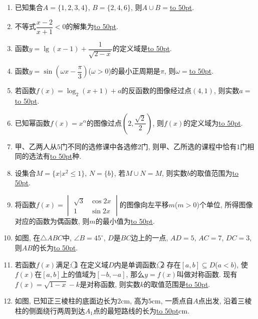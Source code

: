 \documentclass[10pt,a4paper]{article}
\newcommand{\blank}[1]{\underline{\hbox to #1pt{}}}
\begin{document}
\begin{enumerate}[1.]

\item 已知集合$A=\{1,2,3,4\}$, $B=\{2,4,6\}$, 则$A\cup B=$\blank{50}.
\item 不等式$\dfrac{x-2}{x+1}<0$的解集为\blank{50}.
\item 函数$y=\lg (x-1)+\dfrac 1{\sqrt {2-x}}$的定义域是\blank{50}.
\item 函数$y=\sin( \omega x-\dfrac{\pi}{3})$($\omega >0$)的最小正周期是$\pi$, 则$\omega =$\blank{50}.
\item 若函数$f(x)=\log_2(x+1)+a$的反函数的图像经过点$(4, 1)$, 则实数$a=$\blank{50}.
\item 已知幂函数$f(x)={x^\alpha}$的图像过点$(2,\dfrac{\sqrt 2}2)$, 则$f(x)$的定义域为\blank{50}.
\item 甲、乙两人从$5$门不同的选修课中各选修$2$门, 则甲、乙所选的课程中恰有$1$门相同的选法有\blank{50}种.
\item 设集合$M=\{x|x^2\le 1\}$, $N=\{b\}$, 若$M\cup N=M$, 则实数$b$的取值范围为\blank{50}.
\item 将函数$f(x)=\begin{vmatrix}
\sqrt 3 & \cos 2x  \\ 1 & \sin 2x  \end{vmatrix}$的图像向左平移$m$($m>0$)个单位, 所得图像对应的函数为偶函数, 则$m$的最小值为\blank{50}.
\item 如图, 在$\triangle ABC$中, $\angle B=45^\circ$, $D$是$BC$边上的一点, $AD=5$, $AC=7$, $DC=3$, 则$AB$的长为\blank{50}.
\begin{center}
\end{center}
\item 若函数$f(x)$满足: \textcircled{1} 在定义域$D$内是单调函数; \textcircled{2} 存在$[a, b]\subseteq D$($a<b$), 使$f(x)$在$[a, b]$上的值域为$[-b, -a]$, 那么$y=f(x)$叫做对称函数. 现有$f(x)=\sqrt {1-x}-k$是对称函数, 则实数$k$的取值范围是\blank{50}.
\item 如图, 已知正三棱柱的底面边长为$2\text{cm}$, 高为$5\text{cm}$,
一质点自$A$点出发, 沿着三棱柱的侧面绕行两周到达$A_1$点的最短路线的长为\blank{50}$\text{cm}$.
\begin{center}

\end{center}
\end{enumerate}
\end{document}
